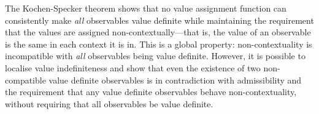 \documentclass[%
 superscriptaddress,
 preprint,
 showpacs,
 showkeys,
 preprintnumbers,
  amsmath,amssymb,
  aps,
 pra,
  longbibliography,
  floatfix,
 ]{revtex4-1}
\theoremstyle{definition}
\newcommand{\bra}[1]{\left< #1 \right|}
\newcommand{\ket}[1]{\left| #1 \right>}
\begin{document}
The Kochen-Specker theorem \cite{kochen1} shows that no value assignment function can consistently make \emph{all} observables value definite while maintaining the requirement that the values are assigned non-contextually---that is, the value of an observable is the same in each context it is in.
This is a global property: non-contextuality is incompatible with \emph{all} observables being value definite.
However, it is possible to localise value indefiniteness and show that even the existence of two non-compatible value definite observables is in contradiction with admissibility and the requirement that any value definite observables behave non-contextuality, without requiring that all observables be value definite.






\end{document}
